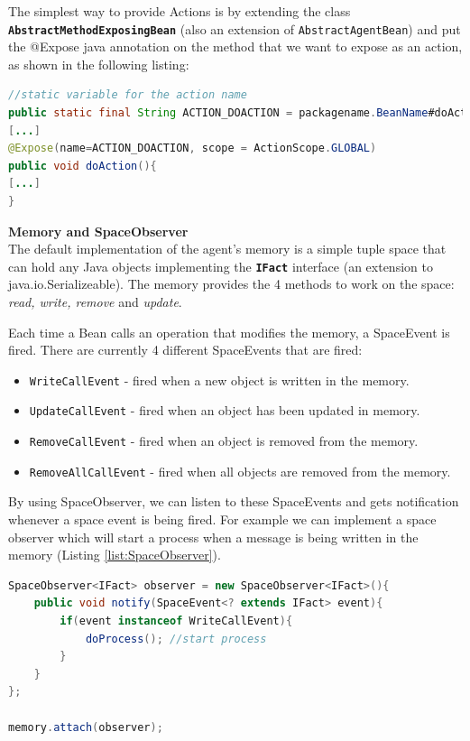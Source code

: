 The simplest way to provide Actions is by extending the class \textbf{\texttt{AbstractMethodExposingBean}} (also an extension of \texttt{AbstractAgentBean}) and put the @Expose java annotation on the method that we want to expose as an action, as shown in the following listing:
\begin{lstlisting}[language = Java, caption = Providing an Action]
//static variable for the action name
public static final String ACTION_DOACTION = packagename.BeanName#doAction;
[...]
@Expose(name=ACTION_DOACTION, scope = ActionScope.GLOBAL)
public void doAction(){
[...]
}
\end{lstlisting}

\textbf{Memory and SpaceObserver}\\
The default implementation of the agent's memory is a simple tuple space that can hold any Java objects implementing the \textbf{\texttt{IFact}} interface (an extension to java.io.Serializeable). The memory provides the 4 methods to work on the space:\textit{ read, write, remove} and \textit{update}.

Each time a Bean calls an operation that modifies the memory, a SpaceEvent is fired. There are currently 4 different SpaceEvents that are fired:
\begin{itemize}
	\item \texttt{WriteCallEvent} - fired when a new object is written in the memory.
	\item \texttt{UpdateCallEvent} - fired when an object has been updated in memory.
	\item \texttt{RemoveCallEvent} - fired when an object is removed from the memory.
	\item \texttt{RemoveAllCallEvent} - fired when all objects are removed from the memory.
\end{itemize}

By using SpaceObserver, we can listen to these SpaceEvents and gets notification whenever a space event is being fired.
For example we can implement a space observer which will start a process when a message is being written in the memory (Listing \ref{list:SpaceObserver}). 
\begin{lstlisting}[language = Java, caption = A SpaceObserver, label = list:SpaceObserver]
SpaceObserver<IFact> observer = new SpaceObserver<IFact>(){
	public void notify(SpaceEvent<? extends IFact> event){
		if(event instanceof WriteCallEvent){
			doProcess(); //start process
		}
	}
};

memory.attach(observer);
\end{lstlisting}

